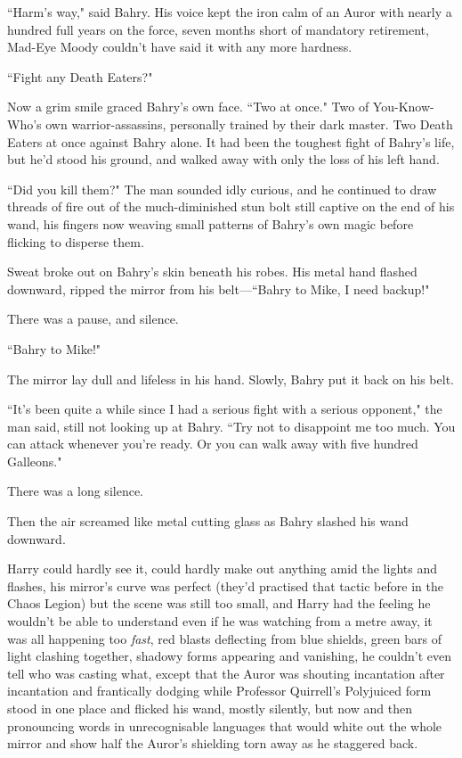 ``Harm's way," said Bahry. His voice kept the iron calm of an Auror with nearly a hundred full years on the force, seven months short of mandatory retirement, Mad-Eye Moody couldn't have said it with any more hardness.

``Fight any Death Eaters?"

Now a grim smile graced Bahry's own face. ``Two at once." Two of You-Know-Who's own warrior-assassins, personally trained by their dark master. Two Death Eaters at once against Bahry alone. It had been the toughest fight of Bahry's life, but he'd stood his ground, and walked away with only the loss of his left hand.

``Did you kill them?" The man sounded idly curious, and he continued to draw threads of fire out of the much-diminished stun bolt still captive on the end of his wand, his fingers now weaving small patterns of Bahry's own magic before flicking to disperse them.

Sweat broke out on Bahry's skin beneath his robes. His metal hand flashed downward, ripped the mirror from his belt—``Bahry to Mike, I need backup!"

There was a pause, and silence.

``Bahry to Mike!"

The mirror lay dull and lifeless in his hand. Slowly, Bahry put it back on his belt.

``It's been quite a while since I had a serious fight with a serious opponent," the man said, still not looking up at Bahry. ``Try not to disappoint me too much. You can attack whenever you're ready. Or you can walk away with five hundred Galleons."

There was a long silence.

Then the air screamed like metal cutting glass as Bahry slashed his wand downward.

\later

Harry could hardly see it, could hardly make out anything amid the lights and flashes, his mirror's curve was perfect (they'd practised that tactic before in the Chaos Legion) but the scene was still too small, and Harry had the feeling he wouldn't be able to understand even if he was watching from a metre away, it was all happening too \emph{fast}, red blasts deflecting from blue shields, green bars of light clashing together, shadowy forms appearing and vanishing, he couldn't even tell who was casting what, except that the Auror was shouting incantation after incantation and frantically dodging while Professor Quirrell's Polyjuiced form stood in one place and flicked his wand, mostly silently, but now and then pronouncing words in unrecognisable languages that would white out the whole mirror and show half the Auror's shielding torn away as he staggered back.

